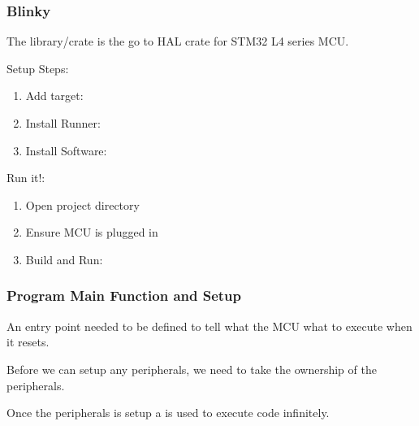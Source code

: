 \documentclass{beamer}
\begin{document}
\begin{frame}
  \frametitle{Blinky}
  The  library/crate is the go to HAL crate for STM32 L4 series MCU.

  Setup Steps:

  \begin{enumerate}
    \item{Add target: }
    \item{Install Runner: }
    \item{Install Software: }
  \end{enumerate}

  Run it!:

  \begin{enumerate}
    \item{Open project directory}
    \item{Ensure MCU is plugged in}
    \item{Build and Run: }
  \end{enumerate}
\end{frame}

\begin{frame}
  \frametitle{Program Main Function and Setup}
  An entry point needed to be defined to tell what the MCU what to execute when it resets.

  

  Before we can setup any peripherals, we need to take the ownership of the peripherals.

  

  Once the peripherals is setup a  is used to execute code infinitely.
\end{frame}
\end{document}
